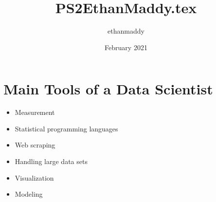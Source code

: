 \documentclass{article}
\title{PS2EthanMaddy.tex}
\author{ethanmaddy }
\date{February 2021}
\begin{document}
\maketitle

\section{Main Tools of a Data Scientist}\citep{Ransoms2021PS2}
\begin{itemize}
  \item Measurement
  \item Statistical programming languages
  \item Web scraping
  \item Handling large data sets
  \item Visualization
  \item Modeling
\end{itemize}



\citep{Ransoms2021PS2}


\end{document}
